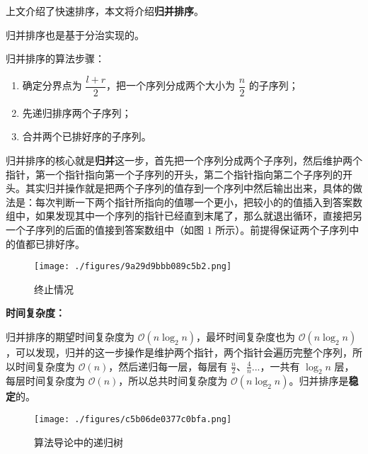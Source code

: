 
上文介绍了快速排序，本文将介绍\textbf{归并排序}。

归并排序也是基于分治实现的。

归并排序的算法步骤：
\begin{enumerate}
\item 确定分界点为 $\dfrac{l + r}{2}$，把一个序列分成两个大小为 $\dfrac{n}{2}$ 的子序列；
\item 先递归排序两个子序列；
\item 合并两个已排好序的子序列。
\end{enumerate}

归并排序的核心就是\textbf{归并}这一步，首先把一个序列分成两个子序列，然后维护两个指针，第一个指针指向第一个子序列的开头，第二个指针指向第二个子序列的开头。其实归并操作就是把两个子序列的值存到一个序列中然后输出出来，具体的做法是：每次判断一下两个指针所指向的值哪一个更小，把较小的的值插入到答案数组中，如果发现其中一个序列的指针已经直到末尾了，那么就退出循环，直接把另一个子序列的后面的值接到答案数组中（如图 $1$ 所示）。前提得保证两个子序列中的值都已排好序。

\begin{figure}[ht]
\centering
\texttt{[image: ./figures/9a29d9bbb089c5b2.png]}
\caption{终止情况} \label{fig_Msort_3}
\end{figure}

\textbf{时间复杂度：}

归并排序的期望时间复杂度为 $\mathcal{O}(n \log_2 n)$，最坏时间复杂度也为 $\mathcal{O}(n \log_2 n)$，可以发现，归并的这一步操作是维护两个指针，两个指针会遍历完整个序列，所以时间复杂度为 $\mathcal{O}(n)$，然后递归每一层，每层有 $\frac{n}{2}$、$\frac{4}{n}$...，一共有 $\log_2 n$ 层，每层时间复杂度为 $\mathcal{O}(n)$，所以总共时间复杂度为 $\mathcal{O}(n \log_2 n)$。归并排序是\textbf{稳定}的。

\begin{figure}[ht]
\centering
\texttt{[image: ./figures/c5b06de0377c0bfa.png]}
\caption{算法导论中的递归树} \label{fig_Msort_1}
\end{figure}

